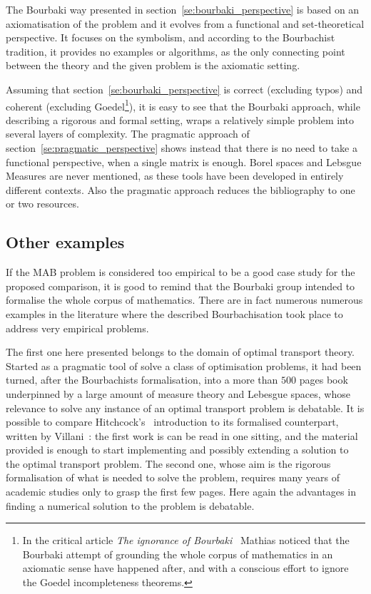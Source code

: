 \documentclass[]{scrartcl}
\theoremstyle{definition}
\begin{document}
The Bourbaki way presented in section~\ref{se:bourbaki_perspective} is based on an axiomatisation of the problem and it evolves from a functional and set-theoretical perspective. It focuses on the symbolism, and according to the Bourbachist tradition, it provides no examples or algorithms, as the only connecting point between the theory and the given problem is the axiomatic setting.

Assuming that section~\ref{se:bourbaki_perspective} is correct (excluding typos) and coherent (excluding Goedel\footnote{
    In the critical article \emph{The ignorance of Bourbaki}~\cite{mathias1992ignorance} Mathias noticed that the Bourbaki attempt of grounding the whole corpus of mathematics in an axiomatic sense have happened after, and with a conscious effort to ignore the Goedel incompleteness theorems.
}), it is easy to see that the Bourbaki approach, while describing a rigorous and formal setting, wraps a relatively simple problem into several layers of complexity.
The pragmatic approach of section~\ref{se:pragmatic_perspective} shows instead that there is no need to take a functional perspective, when a single matrix is enough. Borel spaces and Lebsgue Measures are never mentioned, as these tools have been developed in entirely different contexts. Also the pragmatic approach reduces the bibliography to one or two resources.

\subsection*{Other examples}

If the MAB problem is considered too empirical to be a good case study for the proposed comparison, it is good to remind that the Bourbaki group intended to formalise the whole corpus of mathematics. There are in fact numerous numerous examples in the literature where the described Bourbachisation took place to address very empirical problems. 

The first one here presented belongs to the domain of optimal transport theory. Started as a pragmatic tool of solve a class of optimisation problems, it had been turned, after the Bourbachists formalisation, into a more than $500$ pages book underpinned by a large amount of measure theory and Lebesgue spaces, whose relevance to solve any instance of an optimal transport problem is debatable. It is possible to compare Hitchcock's~\cite{hitchcock1941distribution} introduction to its formalised counterpart, written by Villani~\cite{villani2003topics}: the first work is can be read in one sitting, and the material provided is enough to start implementing and possibly extending a solution to the optimal transport problem. The second one, whose aim is the rigorous formalisation of what is needed to solve the problem, requires many years of academic studies only to grasp the first few pages. Here again the advantages in finding a numerical solution to the problem is debatable.
\end{document}
